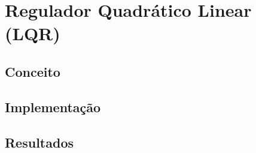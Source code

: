 \section{Regulador Quadrático Linear (LQR)}
\subsection{Conceito}


\subsection{Implementação}


\subsection{Resultados}